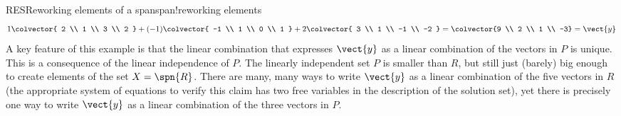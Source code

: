 \begin{example}{RES}{Reworking elements of a span}{span!reworking elements}
%
\begin{equation*}
1\colvector{ 2 \\ 1 \\ 3 \\ 2 }+
(-1)\colvector{ -1 \\ 1 \\ 0 \\ 1 }+
2\colvector{ 3 \\ 1 \\ -1 \\ -2 }
=\colvector{9 \\ 2 \\ 1 \\ -3}
=\vect{y}
\end{equation*}
%
A key feature of this example is that the linear combination that expresses $\vect{y}$ as a linear combination of the vectors in $P$ is unique.  This is a consequence of the linear independence of $P$.  The linearly independent set $P$ is smaller than $R$, but still just (barely) big enough to create elements of the set $X=\spn{R}$.  There are many, many ways to write $\vect{y}$ as a linear combination of the five vectors in $R$ (the appropriate system of equations to verify this claim has two free variables in the description of the solution set), yet there is precisely one way to write $\vect{y}$ as a linear combination of the three vectors in $P$.
\end{example}
%



%

